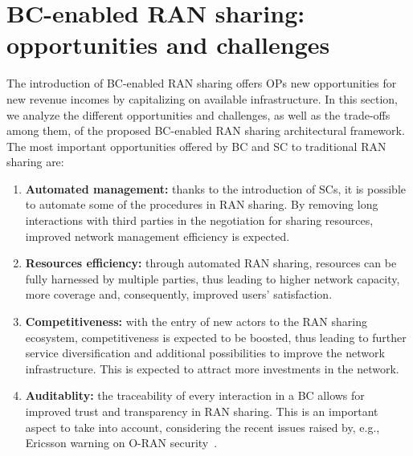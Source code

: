 \documentclass[journal]{IEEEtran}
\begin{document}
\section{BC-enabled RAN sharing: opportunities and challenges}
\label{section:results}
The introduction of BC-enabled RAN sharing offers OPs new opportunities for new revenue incomes by capitalizing on available infrastructure. In this section, we analyze the different opportunities and challenges, as well as the trade-offs among them, of the proposed BC-enabled RAN sharing architectural framework. The most important opportunities offered by BC and SC to traditional RAN sharing are:
\begin{enumerate}
    \item \textbf{Automated management:} thanks to the introduction of SCs, it is possible to automate some of the procedures in RAN sharing. By removing long interactions with third parties in the negotiation for sharing resources, improved network management efficiency is expected.
    \item \textbf{Resources efficiency:} through automated RAN sharing, resources can be fully harnessed by multiple parties, thus leading to higher network capacity, more coverage and, consequently, improved users' satisfaction.
    \item \textbf{Competitiveness:} with the entry of new actors to the RAN sharing ecosystem, competitiveness is expected to be boosted, thus leading to further service diversification and additional possibilities to improve the network infrastructure. This is expected to attract more investments in the network.
    \item \textbf{Auditablity:} the traceability of every interaction in a BC allows for improved trust and transparency in RAN sharing. This is an important aspect to take into account, considering the recent issues raised by, e.g., Ericsson warning on O-RAN security~\cite{boswell2020security}.
\end{enumerate}
\end{document}
